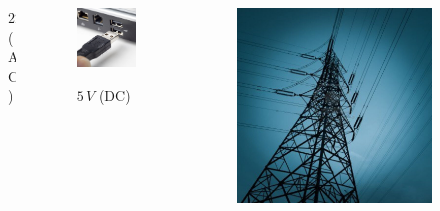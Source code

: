 \documentclass[handout]{beamer}
\theoremstyle{plain}
\begin{document}
\begin{frame}
\begin{columns}
\begin{column}{0.3\textwidth}
\begin{figure}
    $ 220 \, V $ (AC)
  \end{figure}    
  \end{column}
  \begin{column}{0.3\textwidth}
  \begin{figure}
    \includegraphics[width=\columnwidth]{img/usb.jpg}

    $ 5 \, V $ (DC)
  \end{figure}    
  \end{column}
  \begin{column}{0.3\textwidth}
  \begin{figure}
    \includegraphics[width=\columnwidth]{img/altatensione.jpg}


\end{figure}
\end{column}
\end{columns}
\end{frame}
\end{document}
